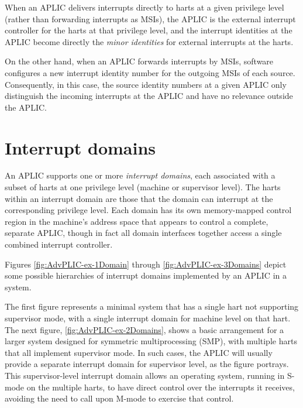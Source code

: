 When an APLIC delivers interrupts directly to harts at a given
privilege level (rather than forwarding interrupts as MSIs), the APLIC
is the external interrupt controller for the harts at that privilege
level, and the interrupt identities at the APLIC become directly the
\emph{minor identities} for external interrupts at the harts.

On the other hand, when an APLIC forwards interrupts by MSIs, software
configures a new interrupt identity number for the outgoing MSIs of
each source.
Consequently, in this case, the source identity numbers at a given
APLIC only distinguish the incoming interrupts at the APLIC and have no
relevance outside the APLIC.

\section{Interrupt domains}

An APLIC supports one or more \emph{interrupt domains}, each
associated with a subset of {\RISCV} harts at one privilege level
(machine or supervisor level).
The harts within an interrupt domain are those that the domain can
interrupt at the corresponding privilege level.
Each domain has its own memory-mapped control region in the machine's
address space that appears to control a complete, separate APLIC,
though in fact all domain interfaces together access a single combined
interrupt controller.

Figures \ref{fig:AdvPLIC-ex-1Domain} through
\ref{fig:AdvPLIC-ex-3Domains} depict some possible hierarchies of
interrupt domains implemented by an APLIC in a {\RISCV} system.

The first figure represents a minimal system that has a single hart not
supporting supervisor mode, with a single interrupt domain for machine
level on that hart.
The next figure, \ref{fig:AdvPLIC-ex-2Domains}, shows a basic
arrangement for a larger system designed for symmetric multiprocessing
(SMP), with multiple harts that all implement supervisor mode.
In such cases, the APLIC will usually provide a separate interrupt
domain for supervisor level, as the figure portrays.
This supervisor-level interrupt domain allows an operating system,
running in \mbox{S-mode} on the multiple harts, to have direct control
over the interrupts it receives, avoiding the need to call upon
\mbox{M-mode} to exercise that control.

